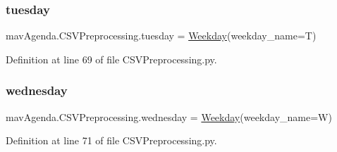 \subsubsection{\texorpdfstring{tuesday}{tuesday}}
{\footnotesize\ttfamily mav\+Agenda.\+C\+S\+V\+Preprocessing.\+tuesday = \mbox{\hyperlink{classmavAgenda_1_1landing_1_1models_1_1Weekday}{Weekday}}(weekday\+\_\+name=\textquotesingle{}T\textquotesingle{})}



Definition at line 69 of file C\+S\+V\+Preprocessing.\+py.

\mbox{\label{namespacemavAgenda_1_1CSVPreprocessing_a41bcd79684eee2d826705a1f2f68e722}} 
\subsubsection{\texorpdfstring{wednesday}{wednesday}}
{\footnotesize\ttfamily mav\+Agenda.\+C\+S\+V\+Preprocessing.\+wednesday = \mbox{\hyperlink{classmavAgenda_1_1landing_1_1models_1_1Weekday}{Weekday}}(weekday\+\_\+name=\textquotesingle{}W\textquotesingle{})}



Definition at line 71 of file C\+S\+V\+Preprocessing.\+py.

